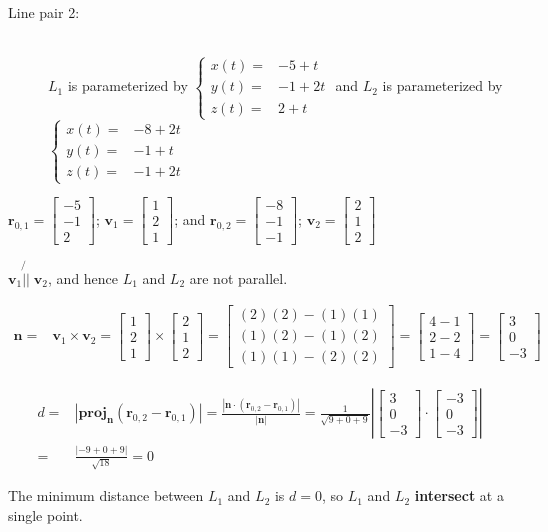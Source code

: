 \documentclass{article}
\newcommand{\abs}[1]{\left|#1\right|}
\newcommand{\colvec}[3]{\begin{bmatrix} #1 \\ #2 \\ #3 \end{bmatrix}}
\newcommand{\dr}[1]{\textcolor{dark_red}{#1}}
\begin{document}
\begin{description}
\item[Line pair 2:] ~ \\
\(L_1\) is parameterized by \(\left\{\begin{array}{rl} x(t) = & -5 + t \\ y(t) = & -1 + 2t \\ z(t) = & 2 + t \end{array}\right.\) and
\(L_2\) is parameterized by \(\left\{\begin{array}{rl} x(t) = & -8 + 2t \\ y(t) = & -1 + t \\ z(t) = & -1 + 2t \end{array}\right.\)
\end{description}

\dr{\(\mathbf{r}_{0,1} = \colvec{-5}{-1}{2}\); \(\mathbf{v}_1 = \colvec{1}{2}{1}\); and \(\mathbf{r}_{0,2} = \colvec{-8}{-1}{-1}\); \(\mathbf{v}_2 = \colvec{2}{1}{2}\)}

\dr{\(\mathbf{v}_1 \not{\!||}\; \mathbf{v}_2\), and hence \(L_1\) and \(L_2\) are not parallel.}

\dr{\begin{align*}
\mathbf{n} = & \mathbf{v}_1 \times \mathbf{v}_2 
= \colvec{1}{2}{1} \times \colvec{2}{1}{2} 
= \colvec{(2)(2) - (1)(1)}{(1)(2) - (1)(2)}{(1)(1) - (2)(2)} 
= \colvec{4 - 1}{2 - 2}{1 - 4} 
= \colvec{3}{0}{-3}
\end{align*}}

\dr{\begin{align*}
d = & \abs{\textbf{proj}_{\mathbf{n}}(\mathbf{r}_{0,2} - \mathbf{r}_{0,1})} 
= \frac{\abs{\mathbf{n} \cdot (\mathbf{r}_{0,2} - \mathbf{r}_{0,1})}}{\abs{\mathbf{n}}} 
= \frac{1}{\sqrt{9 + 0 + 9}}\abs{\colvec{3}{0}{-3} \cdot \colvec{-3}{0}{-3}} \\
= & \frac{\abs{-9 + 0 + 9}}{\sqrt{18}}
= 0
\end{align*}
}

\dr{The minimum distance between \(L_1\) and \(L_2\) is \(d = 0\), so \(L_1\) and \(L_2\) \textbf{intersect} at a single point.}
\end{document}
